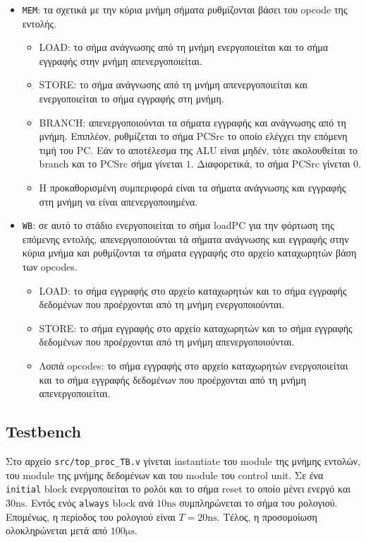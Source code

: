\begin{itemize}
	\item \texttt{MEM}: τα σχετικά με την κύρια μνήμη σήματα ρυθμίζονται βάσει του opcode της εντολής. \begin{itemize}
		      \item LOAD: το σήμα ανάγνωσης από τη μνήμη ενεργοποιείται και το σήμα εγγραφής στην μνήμη απενεργοποιείται.
		      \item STORE: το σήμα ανάγνωσης από τη μνήμη απενεργοποιείται και ενεργοποιείται το σήμα εγγραφής στη μνήμη.
		      \item BRANCH: απενεργοποιούνται τα σήματα εγγραφής και ανάγνωσης από τη μνήμη. Επιπλέον, ρυθμίζεται το σήμα PCSrc το οποίο ελέγχει την επόμενη τιμή του PC. Εάν το αποτέλεσμα της ALU είναι μηδέν, τότε ακολουθείται το branch και το PCSrc σήμα γίνεται $1$. Διαφορετικά, το σήμα PCSrc γίνεται $0$.
		    \item Η προκαθορισμένη συμπεριφορά είναι τα σήματα ανάγνωσης και εγγραφής στη μνήμη να είναι απενεργοποιημένα.
	      \end{itemize}
	\item \texttt{WB}: σε αυτό το στάδιο ενεργοποιείται το σήμα loadPC για την φόρτωση της επόμενης εντολής, απενεργοποιούνται τά σήματα ανάγνωσης και εγγραφής στην κύρια μνήμα και ρυθμίζονται τα σήματα εγγραφής στο αρχείο καταχωρητών βάση των opcodes.\begin{itemize}
		      \item LOAD: το σήμα εγγραφής στο αρχείο καταχωρητών και το σήμα εγγραφής δεδομένων που προέρχονται από τη μνήμη ενεργοποιούνται.
		      \item STORE: το σήμα εγγραφής στο αρχείο καταχωρητών και το σήμα εγγραφής δεδομένων που προέρχονται από τη μνήμη απενεργοποιούνται.
		      \item Λοιπά opcodes: το σήμα εγγραφής στο αρχείο καταχωρητών ενεργοποιείται και το σήμα εγγραφής δεδομένων που προέρχονται από τη μνήμη απενεργοποιείται.
	      \end{itemize}
\end{itemize}

\subsection{Testbench}

Στο αρχείο \texttt{src/top\_proc\_TB.v} γίνεται instantiate του module της μνήμης εντολών, του module της μνήμης δεδομένων και του module του control unit. Σε ένα \texttt{initial} block ενεργοποιείται το ρολόι και το σήμα reset το οποίο μένει ενεργό και $30\unit{\nano\second}$. Εντός ενός \texttt{always} block ανά $10\unit{\nano\second}$ συμπληρώνεται το σήμα του ρολογιού. Επομένως, η περίοδος του ρολογιού είναι $T=20\unit{\nano\second}$. Τέλος, η προσομοίωση ολοκληρώνεται μετά από $100\unit{\micro\second}$.\par

